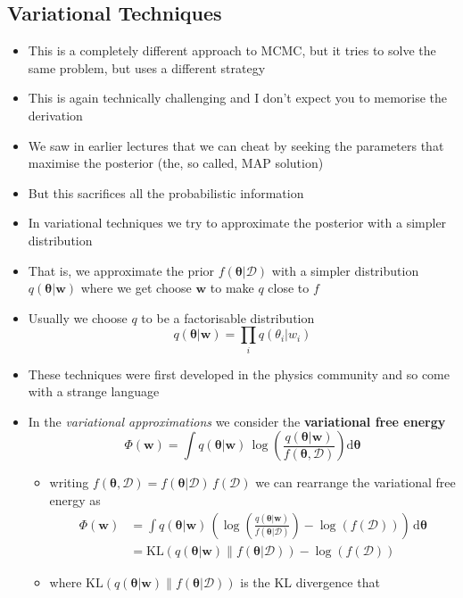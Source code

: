 \documentclass[11pt]{article}
\newcommand{\logg}[1]{\log\!\left( #1 \right)}
\newcommand{\dd}{\mathrm{d}}
\begin{document}
\subsection{Variational Techniques}
\label{sec:orgd3ac26a}
\begin{itemize}
\item This is a completely different approach to MCMC, but it tries to
solve the same problem, but uses a different strategy
\item This is again technically challenging and I don't expect you to
memorise the derivation
\item We saw in earlier lectures that we can cheat by seeking the parameters that maximise
the posterior (the, so called, MAP solution)
\item But this sacrifices all the probabilistic information
\item In variational techniques we try to approximate the posterior
with a simpler distribution
\item That is, we approximate the prior \(f(\bm{\theta}|\mathcal{D})\)
with a simpler distribution \(q(\bm{\theta}|\bm{w})\) where we get
choose \(\bm{w}\) to make \(q\) close to \(f\)
\item Usually we choose \(q\) to be a factorisable distribution
$$ q(\bm{\theta}|\bm{w}) = \prod_{i} q(\theta_{i}|w_{i}) $$
\item These techniques were first developed in the physics community
and so come with a strange language
\item In the \emph{variational approximations} we consider the \textbf{variational free
energy}
$$ \Phi(\bm{w}) = \int q(\bm{\theta}|\bm{w}) \,
     \logg{\frac{q(\bm{\theta}|\bm{w})}{f(\bm{\theta},\mathcal{D})}}
     \dd \bm{\theta} $$
\begin{itemize}
\item writing \(f(\bm{\theta},\mathcal{D}) =
       f(\bm{\theta}|\mathcal{D})\, f(\mathcal{D})\) we can rearrange the
variational free energy as
\begin{align*}
 \Phi(\bm{w}) &= \int q(\bm{\theta}|\bm{w}) \, \left(
 \logg{\frac{q(\bm{\theta}|\bm{w})}{f(\bm{\theta}|\mathcal{D})}} -
 \logg{f(\mathcal{D})} \right) \, \dd \bm{\theta} \\
 &= \mathrm{KL}\!\left(q(\bm{\theta}|\bm{w}) \big\|
 f(\bm{\theta}|\mathcal{D})\right)  - \logg{f(\mathcal{D})} 
 \end{align*}
\item where \(\mathrm{KL}\!\left(q(\bm{\theta}|\bm{w}) \big\|
        f(\bm{\theta}|\mathcal{D})\right)\) is the KL divergence that

\end{itemize}
\end{itemize}
\end{document}
